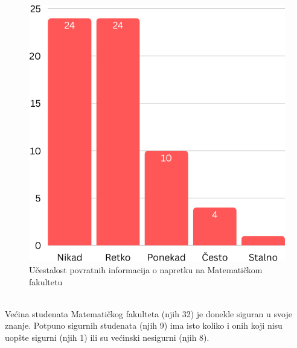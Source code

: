 \documentclass[a4paper]{article}
\begin{document}
\begin{figure}[h!]
\begin{center}
    \includegraphics[scale = 0.3]{PovratneInformacijeMatf.png}
    \caption{Učestalost povratnih informacija o napretku na Matematičkom fakultetu}
    \label{fig:povratne_informacije_matf}
\end{center}
\end{figure}
\\Većina studenata Matematičkog fakulteta (njih 32) je donekle siguran u svoje znanje. Potpuno sigurnih studenata (njih 9) ima isto koliko i onih koji nisu uopšte sigurni (njih 1) ili su većinski nesigurni (njih 8).\\
\end{document}
